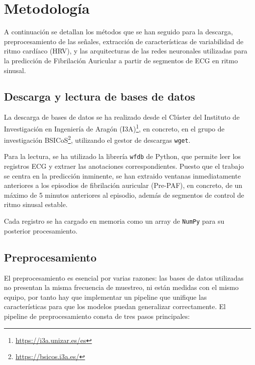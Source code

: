 
\chapter{Metodología}
\label{chap:metodologia}

A continuación se detallan los métodos que se han seguido para la descarga, preprocesamiento
de las señales, extracción de características de variabilidad de ritmo cardíaco  (HRV),
y las arquitecturas de las redes neuronales utilizadas para la predicción de
Fibrilación Auricular a partir de segmentos de ECG en ritmo sinusal.

\section{Descarga y lectura de bases de datos}
\label{sec:descarga}

La descarga de bases de datos se ha realizado desde el Clúster del Instituto de Investigación en
Ingeniería de Aragón (I3A)\footnote{\url{https://i3a.unizar.es/es}}, en concreto, en el grupo de investigación BSICoS\footnote{\url{https://bsicos.i3a.es/}},
utilizando el gestor de descargas \texttt{wget}.

Para la lectura, se ha utilizado la librería \texttt{wfdb} de Python,
que permite leer los registros ECG y extraer las anotaciones correspondientes.
Puesto que el trabajo se centra en la predicción inminente, se han extraido ventanas
inmediatamente anteriores a los episodios de fibrilación auricular (Pre-PAF), en concreto,
de un máximo de 5 minutos anteriores al episodio, además de segmentos de control de ritmo sinusal estable.

Cada registro se ha cargado en memoria como un array de \texttt{NumPy} para su posterior procesamiento.


\section{Preprocesamiento}
\label{sec:preprocesamiento}

El preprocesamiento es esencial por varias razones: las bases de datos utilizadas no
presentan la misma frecuencia de muestreo, ni están medidas con el mismo equipo, por tanto
hay que implementar un pipeline que unifique las características para que los modelos puedan generalizar correctamente.
El pipeline de preprocesamiento consta de tres pasos principales:


